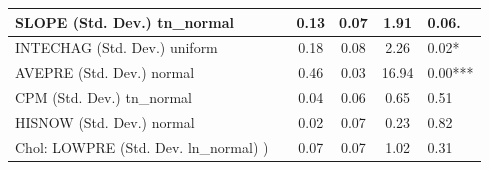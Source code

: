 \begin{table}
\begin{center}
\begin{tabular}{|l|l|c|c|c|l|}
			\hline
			SLOPE (Std. Dev.) tn_normal &  & 0.13 & 0.07 & 1.91 & 0.06. \\
			\hline
			INTECHAG (Std. Dev.) uniform &  & 0.18 & 0.08 & 2.26 & 0.02* \\
			\hline
			AVEPRE (Std. Dev.) normal &  & 0.46 & 0.03 & 16.94 & 0.00*** \\
			\hline
			CPM (Std. Dev.) tn_normal &  & 0.04 & 0.06 & 0.65 & 0.51 \\
			\hline
			HISNOW (Std. Dev.) normal &  & 0.02 & 0.07 & 0.23 & 0.82 \\
			\hline
			 Chol: LOWPRE (Std. Dev. ln_normal) ) &  & 0.07 & 0.07 & 1.02 & 0.31 \\
			\hline
		\end{tabular}
	\end{center}
\end{table}